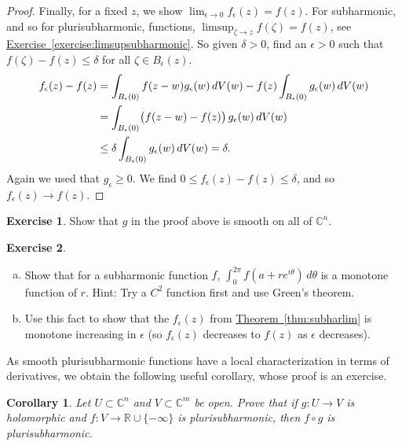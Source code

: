 \documentclass[12pt,openany]{book}
\newcommand{\avoidbreak}{\postdisplaypenalty=100}
\newcommand{\C}{{\mathbb{C}}}
\newcommand{\R}{{\mathbb{R}}}
\theoremstyle{plain}
\newtheorem{cor}[thm]{Corollary}
\theoremstyle{remark}
\theoremstyle{definition}
\newenvironment{exbox}{%
    \def\FrameCommand{\vrule width 1pt \relax\hspace{10pt}}%
    \MakeFramed{\advance\hsize-\width\FrameRestore}%
}{%
    \endMakeFramed
}
\newenvironment{exparts}{%
    \leavevmode\begin{enumerate}[a),noitemsep,topsep=0pt,parsep=0pt,partopsep=0pt]
}{%
    \end{enumerate}
}
\theoremstyle{exercise}
\newtheorem{exercise}{Exercise}[section]
\theoremstyle{example}
\newcommand{\exerciseref}[1]{\hyperref[#1]{Exercise~\ref*{#1}}}
\newcommand{\thmref}[1]{\hyperref[#1]{Theorem~\ref*{#1}}}
\begin{document}
\begin{proof}
Finally, for a fixed $z$, we show $\lim_{\epsilon \to 0} f_\epsilon (z) = f(z)$.
For subharmonic, and so for plurisubharmonic,
functions, $\limsup_{\zeta\to z} f(\zeta) = f(z)$,
see \exerciseref{exercise:limsupsubharmonic}.
So given $\delta >0$, find an $\epsilon >0$ such that
$f(\zeta)-f(z) \leq \delta$ for all $\zeta \in B_\epsilon(z)$.
\begin{equation*}
\begin{split}
f_\epsilon(z) - f(z)
& =
\int_{B_\epsilon(0)} f(z-w) g_\epsilon (w)
\, dV(w)
- f(z)
\int_{B_\epsilon(0)} g_\epsilon (w)
\, dV(w)
\\
& =
\int_{B_\epsilon(0)} \bigl(f(z-w)-f(z)\bigr)\, g_\epsilon (w)
\, dV(w)
\\
& \leq
\delta
\int_{B_\epsilon(0)} g_\epsilon (w)
\, dV(w)
= \delta .
\avoidbreak
\end{split}
\end{equation*}
Again we used that $g_\epsilon \geq 0$.
We find $0 \leq f_\epsilon(z) - f(z) \leq \delta$, and so $f_\epsilon(z) \to
f(z)$.
\end{proof}

\begin{exbox}
\begin{exercise}
Show that $g$ in the proof above is smooth on all of $\C^n$.
\end{exercise}

\begin{exercise}
\begin{exparts}
\item
Show that for a subharmonic function $f$, $\int_0^{2\pi} f(a+re^{i\theta}) \,
d\theta$ is a monotone function of $r$.
Hint: Try a $C^2$ function first and use Green's theorem.
\item
Use this
fact to show that the $f_\epsilon(z)$ from \thmref{thm:subharlim} is monotone
increasing in $\epsilon$ (so $f_\epsilon(z)$ decreases to $f(z)$
as $\epsilon$ decreases).
\end{exparts}
\end{exercise}
\end{exbox}

As smooth plurisubharmonic functions have a
local characterization in terms of derivatives,
we obtain the following useful corollary,
whose proof is an exercise.

\begin{cor} \label{cor:pshcompose}
Let $U \subset \C^n$
and $V \subset \C^m$ be open.
Prove that
if $g \colon U \to V$ is holomorphic and
$f \colon V \to \R \cup \{ - \infty \}$ is plurisubharmonic,
then $f \circ g$ is plurisubharmonic.
\end{cor}
\end{document}
